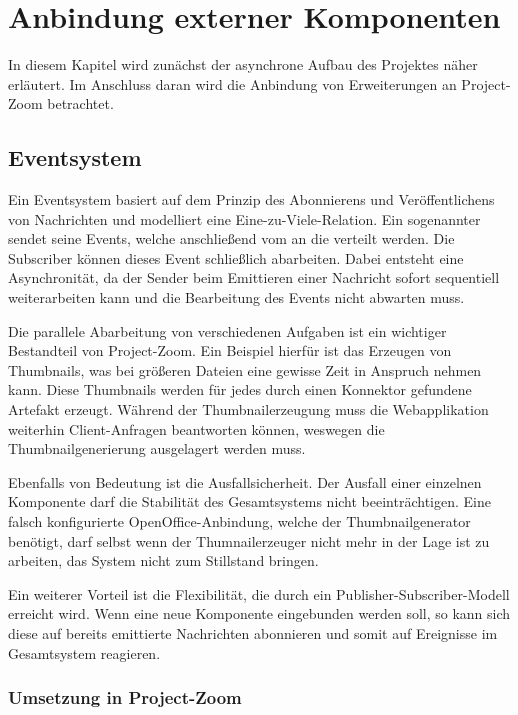 \chapter{Anbindung externer Komponenten}
In diesem Kapitel wird zunächst der asynchrone Aufbau des Projektes näher erläutert. Im Anschluss daran wird die Anbindung von Erweiterungen an Project-Zoom betrachtet.

\section{Eventsystem}
Ein Eventsystem basiert auf dem Prinzip des Abonnierens und Veröffentlichens von Nachrichten und modelliert eine Eine-zu-Viele-Relation. Ein sogenannter  sendet seine Events, welche anschließend vom  an die  verteilt werden. Die Subscriber können dieses Event schließlich abarbeiten. Dabei entsteht eine Asynchronität, da der Sender beim Emittieren einer Nachricht sofort sequentiell weiterarbeiten kann und die Bearbeitung des Events nicht abwarten muss.

Die parallele Abarbeitung von verschiedenen Aufgaben ist ein wichtiger Bestandteil von Project-Zoom. Ein Beispiel hierfür ist das Erzeugen von Thumbnails, was bei größeren Dateien eine gewisse Zeit in Anspruch nehmen kann. Diese Thumbnails werden für jedes durch einen Konnektor gefundene Artefakt erzeugt. Während der Thumbnailerzeugung muss die Webapplikation weiterhin Client-Anfragen beantworten können, weswegen die Thumbnailgenerierung ausgelagert werden muss.

Ebenfalls von Bedeutung ist die Ausfallsicherheit. Der Ausfall einer einzelnen Komponente darf die Stabilität des Gesamtsystems nicht beeinträchtigen. Eine falsch konfigurierte OpenOffice-Anbindung, welche der Thumbnailgenerator benötigt, darf selbst wenn der Thumnailerzeuger nicht mehr in der Lage ist zu arbeiten, das System nicht zum Stillstand bringen.

Ein weiterer Vorteil ist die Flexibilität, die durch ein Publisher-Subscriber-Modell erreicht wird. Wenn eine neue Komponente eingebunden werden soll, so kann sich diese auf bereits emittierte Nachrichten abonnieren und somit auf Ereignisse im Gesamtsystem reagieren.

\subsection{Umsetzung in Project-Zoom}

